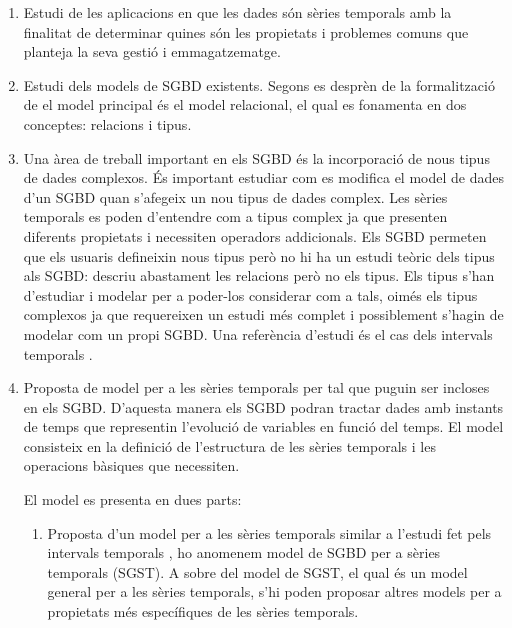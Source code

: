 \begin{enumerate}

\item Estudi de les aplicacions en que les dades són sèries temporals
  amb la finalitat de determinar quines són les propietats i problemes
  comuns que planteja la seva gestió i emmagatzematge.

\item Estudi dels models de SGBD existents. Segons es desprèn de la
  formalització de \textcite{date:introduction} el model principal és
  el model relacional, el qual es fonamenta en dos conceptes:
  relacions i tipus. 

\item Una àrea de treball important en els SGBD és la incorporació
  de nous tipus de dades complexos. És important estudiar com es
  modifica el model de dades d'un SGBD quan s'afegeix un nou tipus de
  dades complex.  Les sèries temporals es poden d'entendre com a tipus
  complex ja que presenten diferents propietats i necessiten operadors
  addicionals.  Els SGBD permeten que els usuaris defineixin nous
  tipus \parencite{stonebraker86} però no hi ha un estudi teòric dels
  tipus als SGBD: \textcite{date:introduction} descriu abastament les
  relacions però no els tipus. Els tipus s'han d'estudiar i modelar
  per a poder-los considerar com a tals, oimés els tipus complexos ja
  que requereixen un estudi més complet i possiblement s'hagin de
  modelar com un propi SGBD. Una referència d'estudi és el cas dels
  intervals temporals \parencite{date02:_tempor_data_relat_model}.

\item Proposta de model per a les sèries temporals per tal que puguin
  ser incloses en els SGBD. D'aquesta manera els SGBD podran tractar
  dades amb instants de temps que representin l'evolució de variables
  en funció del temps. El model consisteix en la definició de
  l'estructura de les sèries temporals i les operacions bàsiques que
  necessiten.

  El model es presenta en dues parts:

  \begin{enumerate}
  \item Proposta d'un model per a les sèries temporals similar a
    l'estudi fet pels intervals
    temporals \parencite{date02:_tempor_data_relat_model}, ho anomenem
    model de SGBD per a sèries temporals (SGST). A sobre del model de
    SGST, el qual és un model general per a les sèries temporals, s'hi
    poden proposar altres models per a propietats més específiques de
    les sèries temporals.


\end{enumerate}
\end{enumerate}
